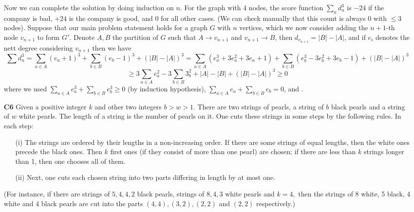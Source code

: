 \documentclass[11pt]{article}
\newcommand{\<}{\langle}
\renewcommand{\>}{\rangle}
\begin{document}
\begin{enumerate}
        Now we can complete the solution by doing induction on $n$. 
        For the graph with 4 nodes, the score function $\sum_{u} d_u^3$ is $-24$ if the company is bad, 
        $+24$ is the company is good, 
        and 0 for all other cases. 
        (We can check manually that this count is always 0 with $\le 3$ nodes). 
        Suppose that our main problem statement holds for a graph $G$ with $n$ vertices, which we now consider adding the $n+1$-th node $v_{n+1}$ to form $G'$. 
        Denote $A, B$ the partition of $G$ such that $A\to v_{n+1}$ and $v_{n+1}\to B$, 
        then $d_{v_{n+1}} = |B| - |A|$, and if $e_i$ denotes the nett degree considering $v_{n+1}$ then we have 
        \[
        \sum d_u^3
        =\sum_{a\in A} (e_a + 1)^3 + \sum_{b\in B} (e_b - 1)^3 + (|B| - |A|)^3
        =\sum_{a\in A} (e_a^3 + 3e_a^2 + 3e_a  + 1) + \sum_{b\in B} (e_b^3 - 3e_b^2 + 3e_b - 1) +  (|B| - |A|)^3
        \]
        \[
        \ge 3\sum_{a\in A}e_a^2 - 3\sum_{b\in B} 3_b^2 + |A| - |B| + (|B| - |A|)^3
        \ge 0
        \]
        where we used $\sum_{a\in A} e_a^3 + \sum_{b\in B} e_b^3\ge 0$ (by induction hypothesis), 
        $\sum_{a\in A} e_a + \sum_{b\in B} e_b= 0$, and . 

	\item [\textbf{C6}] 
	Given a positive integer $k$ and other two integers $b > w > 1.$ There are two strings of pearls, a string of $b$ black pearls and a string of $w$ white pearls. The length of a string is the number of pearls on it. One cuts these strings in some steps by the following rules. In each step:
	\begin{enumerate}
		\item [(i)] The strings are ordered by their lengths in a non-increasing order. If there are some strings of equal lengths, then the white ones precede the black ones. Then $k$ first ones (if they consist of more than one pearl) are chosen; if there are less than $k$ strings longer than 1, then one chooses all of them.
		
		\item [(ii)] Next, one cuts each chosen string into two parts differing in length by at most one. 
	\end{enumerate}
	
	(For instance, if there are strings of $5, 4, 4, 2$ black pearls, strings of $8, 4, 3$ white pearls and $k = 4,$ then the strings of 8 white, 5 black, 4 white and 4 black pearls are cut into the parts $(4,4), (3,2), (2,2)$ and $(2,2)$ respectively.) 
	

\end{enumerate}
\end{document}
